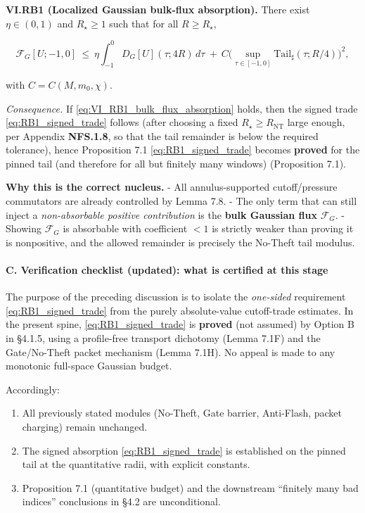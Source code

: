 \documentclass[
  11pt,
]{article}
\providecommand{\tightlist}{%
  \setlength{\itemsep}{0pt}\setlength{\parskip}{0pt}}
\begin{document}
\textbf{VI.RB1 (Localized Gaussian bulk-flux absorption).} There exist \(\eta\in(0,1)\) and \(R_\star\ge 1\) such that for all \(R\ge R_\star\),

\begin{equation}
\mathcal F_G[U;-1,0]
\ \le\ \eta\int_{-1}^{0}D_G[U](\tau;4R)\,d\tau
\ +\ C\Big(\sup_{\tau\in[-1,0]}\mathrm{Tail}_\sharp(\tau;R/4)\Big)^2,
\tag{VI.RB1}\label{eq:VI_RB1_bulk_flux_absorption}
\end{equation}

with \(C=C(M,m_0,\chi)\).

\emph{Consequence.} If \eqref{eq:VI_RB1_bulk_flux_absorption} holds, then the signed trade \eqref{eq:RB1_signed_trade} follows (after choosing a fixed \(R_\star\ge R_{\mathrm{NT}}\) large enough, per Appendix \textbf{NFS.1.8}, so that the tail remainder is below the required tolerance), hence Proposition 7.1 \eqref{eq:RB1_signed_trade} becomes \textbf{proved} for the pinned tail (and therefore for all but finitely many windows) (Proposition 7.1).

\textbf{Why this is the correct nucleus.} - All annulus-supported cutoff/pressure commutators are already controlled by Lemma 7.8. - The only term that can still inject a \emph{non-absorbable positive contribution} is the \textbf{bulk Gaussian flux} \(\mathcal F_G\). - Showing \(\mathcal F_G\) is absorbable with coefficient \(<1\) is strictly weaker than proving it is nonpositive, and the allowed remainder is precisely the No-Theft tail modulus.

\hypertarget{c.-verification-checklist-updated-what-is-certified-at-this-stage}{%
\paragraph{C. Verification checklist (updated): what is certified at this stage}\label{c.-verification-checklist-updated-what-is-certified-at-this-stage}}

The purpose of the preceding discussion is to isolate the \emph{one-sided} requirement \eqref{eq:RB1_signed_trade} from the purely absolute-value cutoff-trade estimates. In the present spine, \eqref{eq:RB1_signed_trade} is \textbf{proved} (not assumed) by Option B in §4.1.5, using a profile-free transport dichotomy (Lemma 7.1F) and the Gate/No-Theft packet mechanism (Lemma 7.1H). No appeal is made to any monotonic full-space Gaussian budget.

Accordingly:

\begin{enumerate}
\def\labelenumi{\arabic{enumi}.}
\tightlist
\item
  All previously stated modules (No-Theft, Gate barrier, Anti-Flash, packet charging) remain unchanged.
\item
  The signed absorption \eqref{eq:RB1_signed_trade} is established on the pinned tail at the quantitative radii, with explicit constants.
\item
  Proposition 7.1 (quantitative budget) and the downstream ``finitely many bad indices'' conclusions in §4.2 are unconditional.
\end{enumerate}
\end{document}
